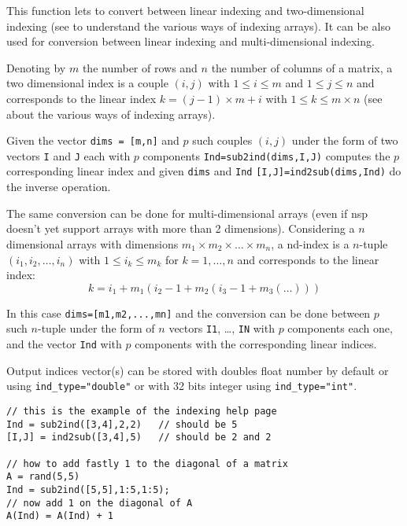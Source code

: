 \begin{mandescription}
This function lets to convert between linear indexing and two-dimensional indexing
(see  to understand the various
ways of indexing arrays). It can be also used for conversion between linear
indexing and multi-dimensional indexing. 


Denoting by $m$ the number of rows and $n$ the number of columns of a matrix, 
a two dimensional index is a couple $(i,j)$ with $1 \le i \le m$ and
$1 \le j \le n$ and corresponds to the linear index $k = (j-1) \times m + i$
with $1 \le k \le m \times n$ (see  
about the various ways of indexing arrays). 

Given the vector \verb+dims = [m,n]+ and $p$ such couples $(i,j)$ under the form 
of two vectors \verb+I+ and \verb+J+ each with $p$ components \verb+Ind=sub2ind(dims,I,J)+
computes the $p$ corresponding linear index and given \verb+dims+ and \verb+Ind+
\verb+[I,J]=ind2sub(dims,Ind)+ do the inverse operation.


The same conversion can be done for multi-dimensional arrays (even if nsp
doesn't yet support arrays with more than 2 dimensions). Considering a $n$
dimensional arrays with dimensions $m_1 \times m_2 \times \dots \times m_n$,
a nd-index is a $n$-tuple $(i_1,i_2,\dots, i_n)$ with $1 \le i_k \le m_k$
for $k=1,\dots,n$ and corresponds to the linear index:
$$
   k = i_1 + m_1 \left( i_2-1 + m_2 \left( i_3 - 1 + m_3 \left( \dots \right) \right) \right)  
$$ 

In this case \verb+dims=[m1,m2,...,mn]+ and the conversion can be done between $p$ such $n$-tuple
under the form of $n$ vectors \verb+I1+, \dots, \verb+IN+ with $p$ components each one, and 
the vector \verb+Ind+ with $p$ components with the corresponding linear indices.    


Output indices vector(s) can be stored with doubles float number by default or using \verb+ind_type="double"+
or with 32 bits integer using \verb+ind_type="int"+.

\end{mandescription}

\begin{examples}
\begin{Verbatim}
// this is the example of the indexing help page
Ind = sub2ind([3,4],2,2)   // should be 5
[I,J] = ind2sub([3,4],5)   // should be 2 and 2

// how to add fastly 1 to the diagonal of a matrix
A = rand(5,5)
Ind = sub2ind([5,5],1:5,1:5);
// now add 1 on the diagonal of A
A(Ind) = A(Ind) + 1
\end{Verbatim}
\end{examples}


\begin{manseealso}
\end{manseealso}

